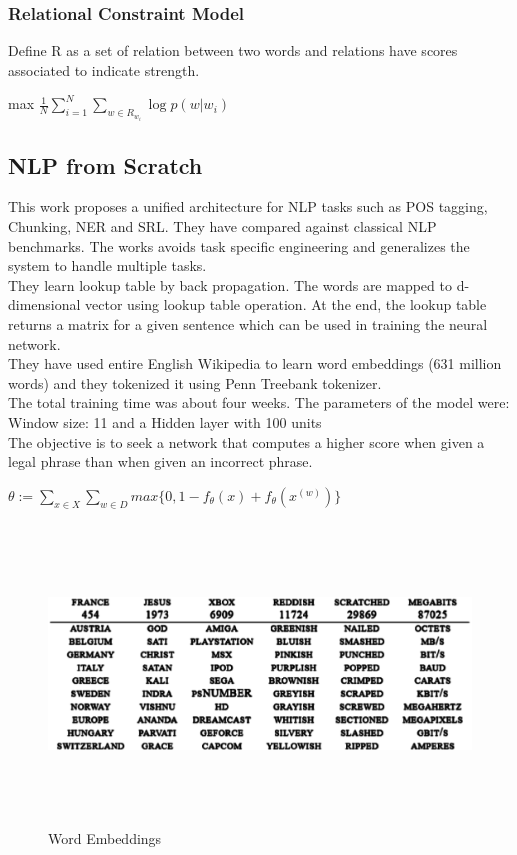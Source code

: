 \documentclass{article}
\begin{document}
\subsubsection{Relational Constraint Model}
Define R as a set of relation between two words and relations have scores associated to indicate strength.
\begin{center} max $ \frac{1}{N}\sum_{i=1}^N \sum_{w \in R_{w_i}}\log p(w | w_i) $  \end{center}

\subsection{NLP from Scratch}
This work proposes a unified architecture for NLP tasks such as POS tagging, Chunking, NER and SRL. They have compared against classical NLP benchmarks. The works avoids task specific engineering and generalizes the system to handle multiple tasks.\\
They learn lookup table by back propagation. The words are mapped to d-dimensional vector using lookup table operation. At the end, the lookup table returns a matrix for a given sentence which can be used in training the neural network.\\
They have used entire English Wikipedia to learn word embeddings (631 million words) and they tokenized it using Penn Treebank tokenizer.\\ 
The total training time was about four weeks. The parameters of the model were:\\
Window size: 11 and a Hidden layer with 100 units \\
The objective is to seek a network that computes a higher score when given a legal phrase than when given an incorrect phrase.
\begin{center} $ \theta := \sum_{x \in X} \sum_{w \in D} max \{0,1-f_{\theta}(x)+f_{\theta}(x^{(w)}) \} $  \end{center}
\begin{figure}[h!tb]
\centering
\includegraphics[width=12cm,height=8cm]{5.eps}
\caption {Word Embeddings}
\end{figure}
\end{document}
